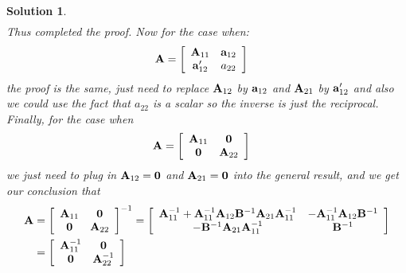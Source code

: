 \documentclass[11pt]{article}\usepackage[]{graphicx}\usepackage[]{color}
\newtheorem{sol}{Solution}
\begin{document}
\begin{sol}
\begin{align*}
	\end{align*}
	Thus completed the proof.\vskip 2mm
	Now for the case when:
	\begin{align*}
		{\bf A} &= \left[\begin{array}{cc} {\bf A}_{11}& {\bf a}_{12}\\ {\bf a}'_{12}& a_{22}\end{array}\right]
	\end{align*}
	the proof is the same, just need to replace ${\bf A}_{12}$ by ${\bf a}_{12}$ and ${\bf A}_{21}$ by ${\bf a}_{12}'$ and also we could use the fact that $a_{22}$ is a scalar so the inverse is just the reciprocal.\vskip 2mm
	Finally, for the case when 
	\begin{align*}
		{\bf A} &= \left[\begin{array}{cc} {\bf A}_{11}&{\bf 0} \\ {\bf 0}& {\bf A}_{22}\end{array}\right]
	\end{align*}
	we just need to plug in  ${\bf A}_{12} = {\bf 0}$ and ${\bf A}_{21} = {\bf 0}$ into the general result, and we get our conclusion that
	\begin{align*}
		{\bf A} &= \left[\begin{array}{cc} {\bf A}_{11}&{\bf 0} \\ {\bf 0}& {\bf A}_{22}\end{array}\right]^{-1} =  \left[\begin{array}{cc} {\bf A}_{11}^{-1} + {\bf A}_{11}^{-1}{\bf A}_{12}{\bf B}^{-1}{\bf A}_{21}{\bf A}_{11}^{-1}& -{\bf A}_{11}^{-1}{\bf A}_{12}{\bf B}^{-1}\\ -{\bf B}^{-1}{\bf A}_{21}{\bf A}_{11}^{-1}& {\bf B}^{-1}\end{array}\right]\\
		&=  \left[\begin{array}{cc} {\bf A}_{11}^{-1} & {\bf 0}\\ {\bf 0}& {\bf A}_{22}^{-1}\end{array}\right]
	\end{align*}
\end{sol}
\end{document}
